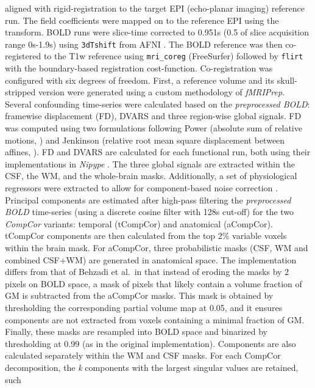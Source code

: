 \documentclass[
]{article}
\begin{document}
\begin{description}
aligned with rigid-registration to the target EPI (echo-planar imaging)
reference run. The field coefficients were mapped on to the reference
EPI using the transform. BOLD runs were slice-time corrected to 0.951s
(0.5 of slice acquisition range 0s-1.9s) using \texttt{3dTshift} from
AFNI \citep[RRID:SCR\_005927]{afni}. The BOLD reference was then
co-registered to the T1w reference using \texttt{mri\_coreg}
(FreeSurfer) followed by \texttt{flirt} \citep[FSL
6.0.5.1:57b01774,][]{flirt} with the boundary-based registration
\citep{bbr} cost-function. Co-registration was configured with six
degrees of freedom. First, a reference volume and its skull-stripped
version were generated using a custom methodology of \emph{fMRIPrep}.
Several confounding time-series were calculated based on the
\emph{preprocessed BOLD}: framewise displacement (FD), DVARS and three
region-wise global signals. FD was computed using two formulations
following Power (absolute sum of relative motions,
\citet{power_fd_dvars}) and Jenkinson (relative root mean square
displacement between affines, \citet{mcflirt}). FD and DVARS are
calculated for each functional run, both using their implementations in
\emph{Nipype} \citep[following the definitions by][]{power_fd_dvars}.
The three global signals are extracted within the CSF, the WM, and the
whole-brain masks. Additionally, a set of physiological regressors were
extracted to allow for component-based noise correction
\citep[\emph{CompCor},][]{compcor}. Principal components are estimated
after high-pass filtering the \emph{preprocessed BOLD} time-series
(using a discrete cosine filter with 128s cut-off) for the two
\emph{CompCor} variants: temporal (tCompCor) and anatomical (aCompCor).
tCompCor components are then calculated from the top 2\% variable voxels
within the brain mask. For aCompCor, three probabilistic masks (CSF, WM
and combined CSF+WM) are generated in anatomical space. The
implementation differs from that of Behzadi et al.~in that instead of
eroding the masks by 2 pixels on BOLD space, a mask of pixels that
likely contain a volume fraction of GM is subtracted from the aCompCor
masks. This mask is obtained by thresholding the corresponding partial
volume map at 0.05, and it ensures components are not extracted from
voxels containing a minimal fraction of GM. Finally, these masks are
resampled into BOLD space and binarized by thresholding at 0.99 (as in
the original implementation). Components are also calculated separately
within the WM and CSF masks. For each CompCor decomposition, the
\emph{k} components with the largest singular values are retained, such

\end{description}
\end{document}
